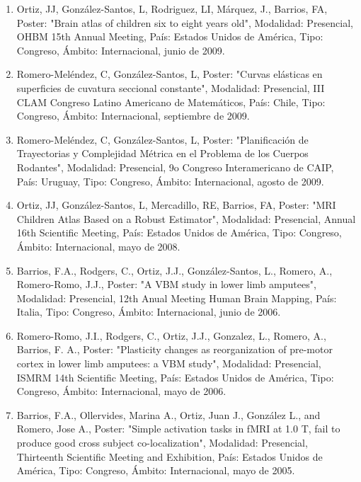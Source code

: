 \begin{enumerate}
\item Ortiz, JJ, González-Santos, L, Rodriguez, LI, Márquez, J., Barrios, FA, Poster: "Brain atlas of children six to eight 
years old", Modalidad: Presencial, OHBM 15th Annual Meeting, País: Estados Unidos de América, Tipo: Congreso, Ámbito: 
Internacional, junio de 2009.

\item Romero-Meléndez, C, González-Santos, L, Poster: "Curvas elásticas en superficies de cuvatura seccional constante", 
Modalidad: Presencial, III CLAM Congreso Latino Americano de Matemáticos, País: Chile, Tipo: Congreso, Ámbito: 
Internacional, septiembre de 2009.

\item Romero-Meléndez, C, González-Santos, L, Poster: "Planificación de Trayectorias y Complejidad Métrica en el Problema de 
los Cuerpos Rodantes", Modalidad: Presencial, 9o Congreso Interamericano de CAIP, País: Uruguay, Tipo: Congreso, Ámbito: 
Internacional, agosto de 2009.

\item Ortiz, JJ, González-Santos, L, Mercadillo, RE, Barrios, FA, Poster: "MRI Children Atlas Based on a Robust Estimator", 
Modalidad: Presencial, Annual 16th Scientific Meeting, País: Estados Unidos de América, Tipo: Congreso, Ámbito: 
Internacional, mayo de 2008.

\item Barrios, F.A., Rodgers, C., Ortiz, J.J., González-Santos, L., Romero, A., Romero-Romo, J.J., Poster: "A VBM study in lower limb amputees", 
Modalidad: Presencial, 12th Anual Meeting Human Brain 
Mapping, País: Italia, Tipo: Congreso, Ámbito: Internacional, junio de 2006.

\item Romero-Romo, J.I., Rodgers, C., Ortiz, J.J., Gonzalez, L., Romero, A., Barrios, F. A., Poster: "Plasticity changes as 
reorganization of pre-motor cortex in lower limb amputees: a VBM study", Modalidad: Presencial, ISMRM 14th Scientific 
Meeting, País: Estados Unidos de América, Tipo: Congreso, Ámbito: Internacional, mayo de 2006.

\item Barrios, F.A., Ollervides, Marina A., Ortiz, Juan J., González L., and Romero, Jose A., Poster: "Simple activation 
tasks in fMRI at 1.0 T, fail to produce good cross subject co-localization", Modalidad: Presencial, Thirteenth Scientific 
Meeting and Exhibition, País: Estados Unidos de América, Tipo: Congreso, Ámbito: Internacional, mayo de 2005.


\end{enumerate}
